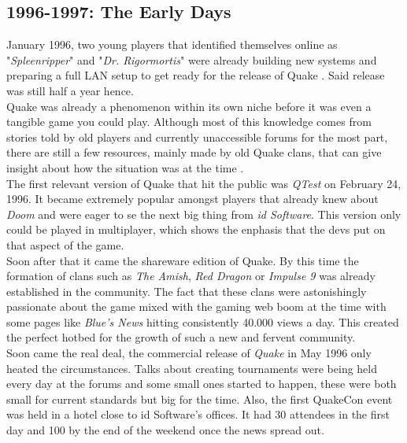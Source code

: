 \subsection{1996-1997: The Early Days}

January 1996, two young players that identified themselves online as "\textit{Spleenripper}" and "\textit{Dr. Rigormortis}" were already building new systems and preparing a full LAN setup to get ready for the release of Quake \citep{clanHistory}. Said release was still half a year hence.\\

Quake was already a phenomenon within its own niche before it was even a tangible game you could play.  Although most of this knowledge comes from stories told by old players and currently unaccessible forums for the most part, there are still a few resources, mainly made by old Quake clans, that can give insight about how the situation was at the time \citep{clanHistory}.\\

The first relevant version of Quake that hit the public was \textit{QTest} \citep{qtest} on February 24, 1996. It became extremely popular amongst players that already knew about \textit{Doom} \cite{game:doom} and were eager to se the next big thing from \textit{id Software}. This version only could be played in multiplayer, which shows the enphasis that the devs put on that aspect of the game.\\

Soon after that it came the shareware edition of Quake. By this time the formation of clans such as \textit{The Amish}, \textit{Red Dragon} or \textit{Impulse 9} was already established in the community. The fact that these clans were astonishingly passionate about the game mixed with the gaming web boom at the time with some pages like \textit{Blue's News} hitting consistently 40.000 views a day. This created the perfect hotbed for the growth of such a new and fervent community.\\

Soon came the real deal, the commercial release of \textit{Quake} \citep{game:quake1} in May 1996 only heated the circumstances. Talks about creating tournaments were being held every day at the forums and some small ones started to happen, these were both small for current standards but big for the time. Also, the first QuakeCon \citep{quakecon} event was held in a hotel close to id Software's offices. It had 30 attendees in the first day and 100 by the end of the weekend once the news spread out.\\

